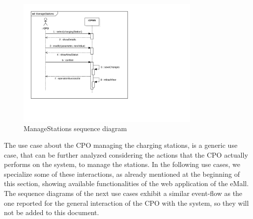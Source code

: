 \begin{figure}[H]
    \centering
    \includegraphics[width=0.8\textwidth, trim={0 4cm 11cm 0}, clip]{Images/cp3/seqDiagrams/ManageStations.pdf}
    \caption{ManageStations sequence diagram}
\end{figure}

The use case about the CPO managing the charging stations, is a generic use case, that can be further analyzed considering the actions that the CPO actually performs on the system, to manage the stations. In the following use cases, we specialize some of these interactions, as already mentioned at the beginning of this section, showing available functionalities of the web application of the eMall. 
The sequence diagrams of the next use cases exhibit a similar event-flow as the one reported for the general interaction of the CPO with the system, so they will not be added to this document.

\clearpage
